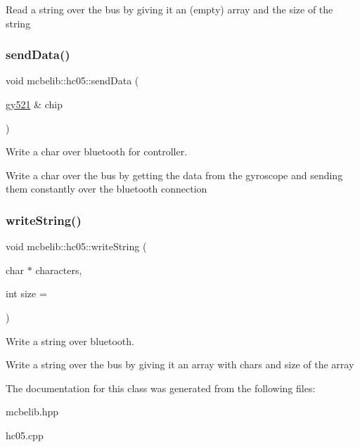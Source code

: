 Read a string over the bus by giving it an (empty) array and the size of the string \mbox{\label{classmcbelib_1_1hc05_ab8e13647d668978bd77654b39572008d}} 
\subsubsection{\texorpdfstring{send\+Data()}{sendData()}}
{\footnotesize\ttfamily void mcbelib\+::hc05\+::send\+Data (\begin{DoxyParamCaption}\item[{\hyperlink{classmcbelib_1_1gy521}{gy521} \&}]{chip }\end{DoxyParamCaption})}



Write a char over bluetooth for controller. 

Write a char over the bus by getting the data from the gyroscope and sending them constantly over the bluetooth connection \mbox{\label{classmcbelib_1_1hc05_a3cd0be8d16a5eb990216b41e533b815c}} 
\subsubsection{\texorpdfstring{write\+String()}{writeString()}}
{\footnotesize\ttfamily void mcbelib\+::hc05\+::write\+String (\begin{DoxyParamCaption}\item[{char $\ast$}]{characters,  }\item[{int}]{size = {} }\end{DoxyParamCaption})}



Write a string over bluetooth. 

Write a string over the bus by giving it an array with chars and size of the array 

The documentation for this class was generated from the following files\+:\begin{DoxyCompactItemize}
\item 
mcbelib.\+hpp\item 
hc05.\+cpp\end{DoxyCompactItemize}
